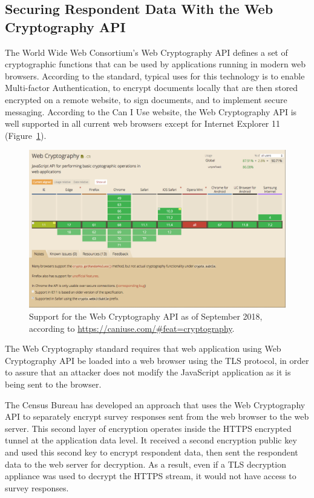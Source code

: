 \documentclass[fleqn,10pt]{wlscirep}
\begin{document}
\subsection{Securing Respondent Data With the Web Cryptography API}

The World Wide Web Consortium's Web Cryptography API\cite{wcapi}
defines a set of cryptographic functions that can be used by
applications running in modern web browsers. According to the
standard, typical uses for this technology is to enable Multi-factor
Authentication, to encrypt documents locally that are then stored
encrypted on a remote website, to sign documents, and to implement
secure messaging. According to the Can I Use website, the Web
Cryptography API is well supported in all current web browsers except
for Internet Explorer 11 (Figure~\ref{caniuse}).

\begin{figure}
  \includegraphics[width=\linewidth]{art/caniuse}
  \caption{Support for the Web Cryptography API as of September 2018,
    according to \url{https://caniuse.com/\#feat=cryptography}.\label{caniuse}}
\end{figure}

The Web Cryptography standard requires that web application using Web
Cryptography API be loaded into a web browser using the TLS protocol, in
order to assure that an attacker does not modify the JavaScript
application as it is being sent to the browser.

The Census Bureau has developed an approach that uses the Web
Cryptography API to separately encrypt survey responses sent from the
web browser to the web server. This second layer of encryption
operates inside the HTTPS encrypted tunnel at the application data
level. It received a second encryption public key and used this second
key to encrypt respondent data, then sent the respondent data to the
web server for decryption. As a result, even if a TLS decryption
appliance was used to decrypt the HTTPS stream, it would not have
access to survey responses.
\end{document}
